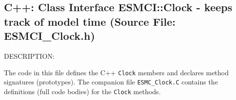  
\setlength{\oldparskip}{\parskip}
\setlength{\parskip}{1.5ex}
\setlength{\oldparindent}{\parindent}
\setlength{\parindent}{0pt}
\setlength{\oldbaselineskip}{\baselineskip}
\setlength{\baselineskip}{11pt}
 
\def\bv{\begin{verbatim}}
\def\ev{\end{verbatim}}
\def\be{\begin{equation}}
\def\ee{\end{equation}}
\def\bea{\begin{eqnarray}}
\def\eea{\end{eqnarray}}
\def\bi{\begin{itemize}}
\def\ei{\end{itemize}}
\def\bn{\begin{enumerate}}
\def\en{\end{enumerate}}
\def\bd{\begin{description}}
\def\ed{\end{description}}
\def\({\left (}
\def\){\right )}
\def\[{\left [}
\def\]{\right ]}
\def\<{\left  \langle}
\def\>{\right \rangle}
\def\cI{{\cal I}}
\def\diag{\mathop{\rm diag}}
\def\tr{\mathop{\rm tr}}


 

  \subsection{C++:  Class Interface ESMCI::Clock - keeps track of model time (Source File: ESMCI\_Clock.h)}


  
{\sf DESCRIPTION:\\ }


  
   The code in this file defines the C++ {\tt Clock} members and declares
   method signatures (prototypes).  The companion file {\tt ESMC\_Clock.C}
   contains the definitions (full code bodies) for the {\tt Clock} methods.
  
